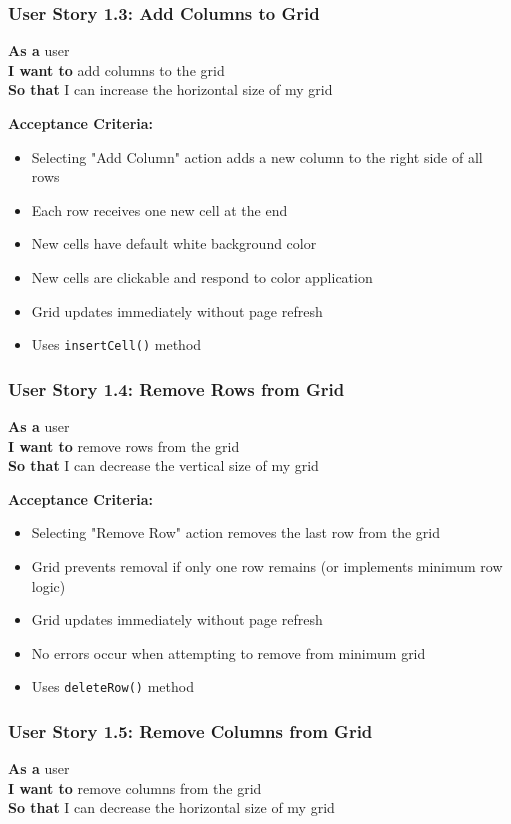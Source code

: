 \documentclass[11pt,a4paper]{article}
\begin{document}
\subsubsection{User Story 1.3: Add Columns to Grid}
\textbf{As a} user\\
\textbf{I want to} add columns to the grid\\
\textbf{So that} I can increase the horizontal size of my grid

\textbf{Acceptance Criteria:}
\begin{itemize}[leftmargin=*]
    \item Selecting "Add Column" action adds a new column to the right side of all rows
    \item Each row receives one new cell at the end
    \item New cells have default white background color
    \item New cells are clickable and respond to color application
    \item Grid updates immediately without page refresh
    \item Uses \texttt{insertCell()} method
\end{itemize}

\subsubsection{User Story 1.4: Remove Rows from Grid}
\textbf{As a} user\\
\textbf{I want to} remove rows from the grid\\
\textbf{So that} I can decrease the vertical size of my grid

\textbf{Acceptance Criteria:}
\begin{itemize}[leftmargin=*]
    \item Selecting "Remove Row" action removes the last row from the grid
    \item Grid prevents removal if only one row remains (or implements minimum row logic)
    \item Grid updates immediately without page refresh
    \item No errors occur when attempting to remove from minimum grid
    \item Uses \texttt{deleteRow()} method
\end{itemize}

\subsubsection{User Story 1.5: Remove Columns from Grid}
\textbf{As a} user\\
\textbf{I want to} remove columns from the grid\\
\textbf{So that} I can decrease the horizontal size of my grid
\end{document}
